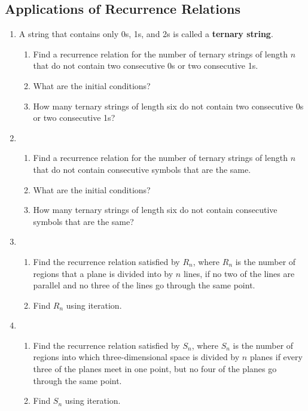 \documentclass{../../cls/sig-alternate-05-2015}
\begin{document}
\subsection{Applications of Recurrence Relations}
\begin{enumerate}
\item A string that contains only 0s, 1s, and 2s is called a \textbf{ternary string}. \begin{enumerate}
    \item Find a recurrence relation for the number of ternary
    strings of length $n$ that do not contain two consecutive
    0s or two consecutive 1s.
    \item What are the initial conditions?
    \item How many ternary strings of length six do not contain
    two consecutive 0s or two consecutive 1s?
\end{enumerate}

\item \begin{enumerate}
    \item Find a recurrence relation for the number of ternary
    strings of length $n$ that do not contain consecutive
    symbols that are the same.
    \item What are the initial conditions?
    \item How many ternary strings of length six do not contain
    consecutive symbols that are the same?
\end{enumerate}

\item \begin{enumerate}
    \item Find the recurrence relation satisfied by $R_n$,
    where $R_n$ is the number of regions that a plane is divided into by $n$ lines,
    if no two of the lines are parallel and no three of the lines go through the same point.
    \item Find $R_n$ using iteration.
\end{enumerate}

\item \begin{enumerate}
    \item Find the recurrence relation satisfied by $S_n$,
    where $S_n$ is the number of regions into which three-dimensional space is divided by $n$ planes if every three of the planes meet in one point,
    but no four of the planes go through the same point.
    \item Find $S_n$ using iteration.
\end{enumerate}

\end{enumerate}
\end{document}

